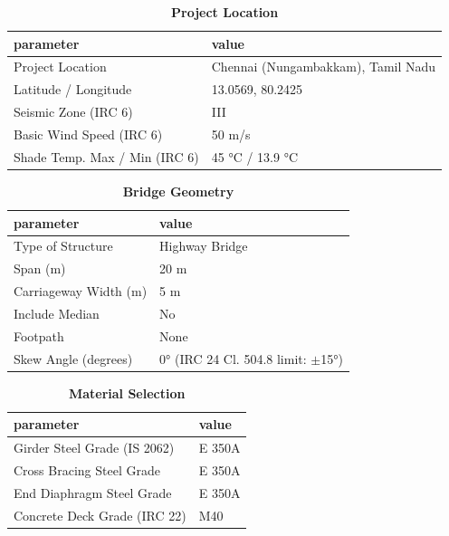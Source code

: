 \documentclass[12pt,a4paper]{report}
\numberwithin{table}{chapter}
\numberwithin{figure}{chapter}
\begin{document}
\begin{table}[H]
\caption{\textbf{Project Location}}
\label{subsec:project-location}
\begin{tabular}{|L{5.5cm}|L{8.5cm}|}
\hline
\textbf{parameter} & \textbf{value} \\
\hline
\textnormal{Project Location} & Chennai (Nungambakkam), Tamil Nadu \\
\hline
\textnormal{Latitude / Longitude} & 13.0569, 80.2425 \\
\hline
\textnormal{Seismic Zone (IRC 6)} & III \\
\hline
\textnormal{Basic Wind Speed (IRC 6)} & 50 m/s \\
\hline
\textnormal{Shade Temp. Max / Min (IRC 6)} & 45 °C / 13.9 °C \\
\hline
\end{tabular}
\vspace{0.4cm}
\end{table}

\begin{table}[H]
\caption{\textbf{Bridge Geometry}}
\label{subsec:bridge-geometry}
\begin{tabular}{|L{5.5cm}|L{8.5cm}|}
\hline
\textbf{parameter} & \textbf{value} \\
\hline
\textnormal{Type of Structure} & Highway Bridge \\
\hline
\textnormal{Span (m)} & 20 m \\
\hline
\textnormal{Carriageway Width (m)} & 5 m \\
\hline
\textnormal{Include Median} & No \\
\hline
\textnormal{Footpath} & None \\
\hline
\textnormal{Skew Angle (degrees)} & 0° (IRC 24 Cl. 504.8 limit: $\pm$15°) \\
\hline
\end{tabular}
\end{table}
\vspace{0.4cm}

\begin{table}[H]
\caption{\textbf{Material Selection}}
\label{subsec:material}
\begin{tabular}{|L{5.5cm}|L{8.5cm}|}
\hline
\textbf{parameter} & \textbf{value} \\
\hline
\textnormal{Girder Steel Grade (IS 2062)} & E 350A \\
\hline
\textnormal{Cross Bracing Steel Grade} & E 350A \\
\hline
\textnormal{End Diaphragm Steel Grade} & E 350A \\
\hline
\textnormal{Concrete Deck Grade (IRC 22)} & M40 \\
\hline
\end{tabular}
\end{table}
\vspace{0.4cm}
\end{document}
